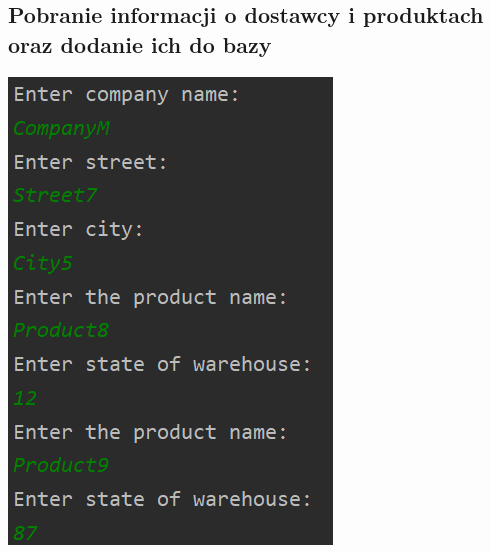\documentclass[a4paper, 11pt]{article}
\begin{document}
    \subsection{Pobranie informacji o dostawcy i produktach oraz dodanie ich do bazy}
    \begin{center}
        \includegraphics[scale=1.3]{images/point5/addSupplierAndProducts.png}
    \end{center}
\end{document}
